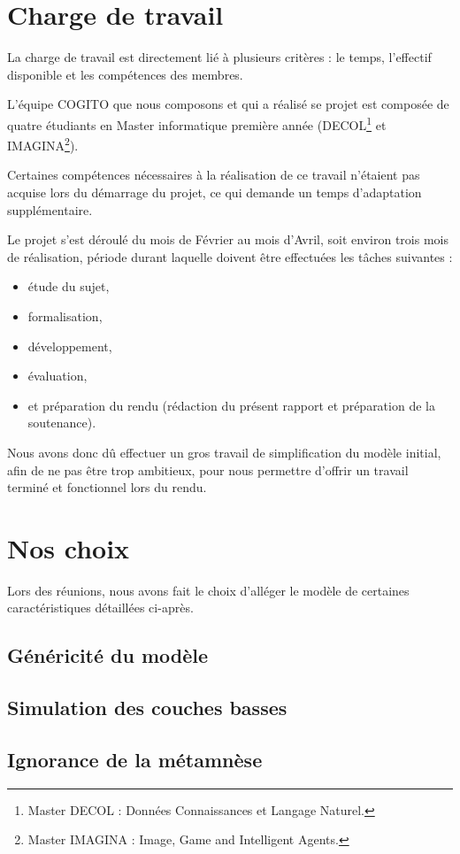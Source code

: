 \section{Charge de travail}
La charge de travail est directement lié à plusieurs critères : le temps, l'effectif disponible et les compétences des membres.

L'équipe COGITO que nous composons et qui a réalisé se projet est composée de quatre étudiants en Master informatique première année (DECOL\footnote{Master DECOL : Données Connaissances et Langage Naturel.} et IMAGINA\footnote{Master IMAGINA : Image, Game and Intelligent Agents.}).

Certaines compétences nécessaires à la réalisation de ce travail n'étaient pas acquise lors du démarrage du projet, ce qui demande un temps d'adaptation supplémentaire.

Le projet s'est déroulé du mois de Février au mois d'Avril, soit environ trois mois de réalisation, période durant laquelle doivent être effectuées les tâches suivantes :

\begin{itemize}
\item étude du sujet, 
\item formalisation, 
\item développement, 
\item évaluation,
\item et préparation du rendu (rédaction du présent rapport et préparation de la soutenance).
\end{itemize}

Nous avons donc dû effectuer un gros travail de simplification du modèle initial, afin de ne pas être trop ambitieux, pour nous permettre d'offrir un travail terminé et fonctionnel lors du rendu.


\section{Nos choix}

Lors des réunions, nous avons fait le choix d'alléger le modèle de certaines caractéristiques détaillées ci-après.

\subsection{Généricité du modèle}
\subsection{Simulation des couches basses}
\subsection{Ignorance de la métamnèse}